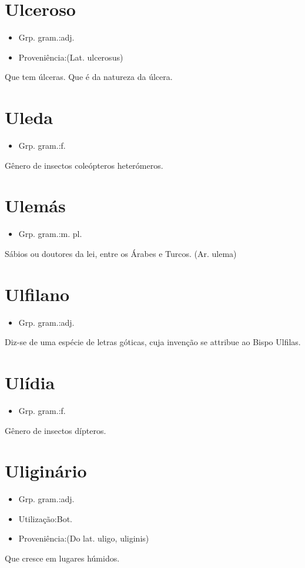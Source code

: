 \documentclass{article}
\begin{document}
\section{Ulceroso}
\begin{itemize}
\item {Grp. gram.:adj.}
\end{itemize}
\begin{itemize}
\item {Proveniência:(Lat. \textunderscore ulcerosus\textunderscore )}
\end{itemize}
Que tem úlceras.
Que é da natureza da úlcera.
\section{Uleda}
\begin{itemize}
\item {Grp. gram.:f.}
\end{itemize}
Gênero de insectos coleópteros heterómeros.
\section{Ulemás}
\begin{itemize}
\item {Grp. gram.:m. pl.}
\end{itemize}
Sábios ou doutores da lei, entre os Árabes e Turcos.
(Ar. \textunderscore ulema\textunderscore )
\section{Ulfilano}
\begin{itemize}
\item {Grp. gram.:adj.}
\end{itemize}
Diz-se de uma espécie de letras góticas, cuja invenção se attribue ao Bispo Ulfilas.
\section{Ulídia}
\begin{itemize}
\item {Grp. gram.:f.}
\end{itemize}
Gênero de insectos dípteros.
\section{Uliginário}
\begin{itemize}
\item {Grp. gram.:adj.}
\end{itemize}
\begin{itemize}
\item {Utilização:Bot.}
\end{itemize}
\begin{itemize}
\item {Proveniência:(Do lat. \textunderscore uligo\textunderscore , \textunderscore uliginis\textunderscore )}
\end{itemize}
Que cresce em lugares húmidos.
\end{document}
